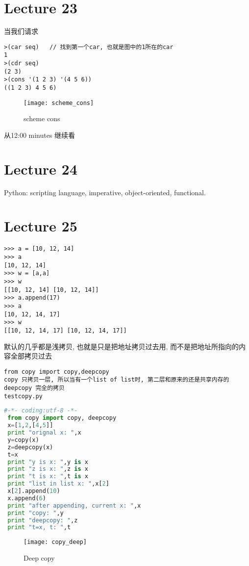 \documentclass{article}
\begin{document}
\section{Lecture 23}
当我们请求
\begin{verbatim}
>(car seq)   // 找到第一个car, 也就是图中的1所在的car
1
>(cdr seq)
(2 3)
>(cons '(1 2 3) '(4 5 6))
((1 2 3) 4 5 6)
\end{verbatim}
\begin{figure}[htbp]
	\centering
	\texttt{[image: scheme\_cons]}\\
	\caption{scheme cons}\label{fig.scheme.cons}
\end{figure}

从12:00 minutes 继续看

\section{Lecture 24}
Python: scripting language, imperative, object-oriented, functional.

\section{Lecture 25}
\begin{verbatim}
>>> a = [10, 12, 14]
>>> a
[10, 12, 14]
>>> w = [a,a]
>>> w
[[10, 12, 14] [10, 12, 14]]
>>> a.append(17)
>>> a
[10, 12, 14, 17]
>>> w
[[10, 12, 14, 17] [10, 12, 14, 17]]
\end{verbatim}
默认的几乎都是浅拷贝, 也就是只是把地址拷贝过去用, 而不是把地址所指向的内容全部拷贝过去

\begin{verbatim}
from copy import copy,deepcopy
copy 只拷贝一层, 所以当有一个list of list时, 第二层和原来的还是共享内存的
deepcopy 完全的拷贝
testcopy.py
\end{verbatim}

\begin{lstlisting}[language = Python]
#-*- coding:utf-8 -*-
 from copy import copy, deepcopy
 x=[1,2,[4,5]]
 print "orignal x: ",x
 y=copy(x)
 z=deepcopy(x)
 t=x
 print "y is x: ",y is x
 print "z is x: ",z is x
 print "t is x: ",t is x
 print "list in list x: ",x[2]
 x[2].append(10)
 x.append(6)
 print "after appending, current x: ",x
 print "copy: ",y
 print "deepcopy: ",z
 print "t=x, t: ",t
 \end{lstlisting}
\begin{figure}[htbp]
	\centering
	\texttt{[image: copy\_deep]}\\
	\caption{Deep copy}\label{fig.copy.deep}
\end{figure}
\end{document}
